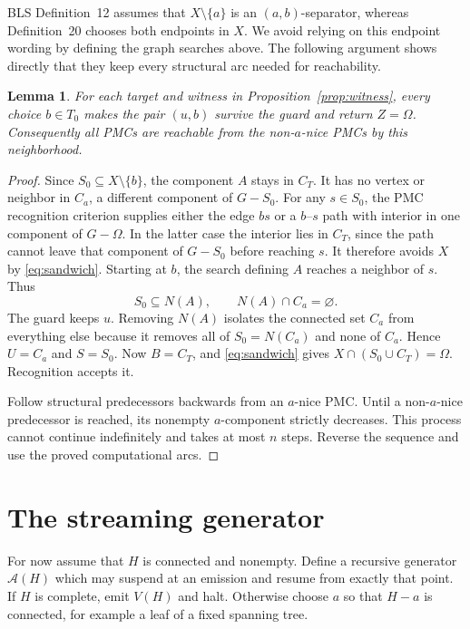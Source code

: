 \documentclass[acmsmall,12pt,screen,nonacm]{acmart}
\newtheorem{lemma}[theorem]{Lemma}
\begin{document}
BLS Definition~12 assumes that $X\setminus\{a\}$ is an $(a,b)$-separator,
whereas Definition~20 chooses both endpoints in $X$. We avoid relying on this
endpoint wording by defining the graph searches above. The following argument
shows directly that they keep every structural arc needed for reachability.

\begin{lemma}\label{lem:transfer}
For each target and witness in Proposition~\ref{prop:witness}, every choice
$b\in T_0$ makes the pair $(u,b)$ survive the guard and return $Z=\Omega$.
Consequently all PMCs are reachable from the non-$a$-nice PMCs by this
neighborhood.
\end{lemma}

\begin{proof}
Since $S_0\subseteq X\setminus\{b\}$, the component $A$ stays in $C_T$.
It has no vertex or neighbor in $C_a$, a different component of $G-S_0$.
For any $s\in S_0$, the PMC recognition criterion supplies either the edge
$bs$ or a $b$--$s$ path with interior in one component of $G-\Omega$.
In the latter case the interior lies in $C_T$, since the path cannot leave
that component of $G-S_0$ before reaching $s$. It therefore avoids $X$ by
\eqref{eq:sandwich}. Starting at $b$, the search defining $A$ reaches a
neighbor of $s$. Thus
\[
 S_0\subseteq N(A),\qquad N(A)\cap C_a=\varnothing.
\]
The guard keeps $u$. Removing $N(A)$ isolates the connected set $C_a$ from
everything else because it removes all of $S_0=N(C_a)$ and none of $C_a$.
Hence $U=C_a$ and $S=S_0$. Now $B=C_T$, and
\eqref{eq:sandwich} gives $X\cap(S_0\cup C_T)=\Omega$. Recognition accepts it.

Follow structural predecessors backwards from an $a$-nice PMC. Until a
non-$a$-nice predecessor is reached, its nonempty $a$-component strictly
decreases. This process cannot continue indefinitely and takes at most $n$
steps. Reverse the sequence and use the proved computational arcs.
\end{proof}

\section{The streaming generator}\label{sec:generator}

For now assume that $H$ is connected and nonempty. Define a recursive generator
$\mathcal A(H)$ which may suspend at an emission and resume from exactly that
point. If $H$ is complete, emit $V(H)$ and halt. Otherwise choose $a$ so that
$H-a$ is connected, for example a leaf of a fixed spanning tree.
\end{document}
